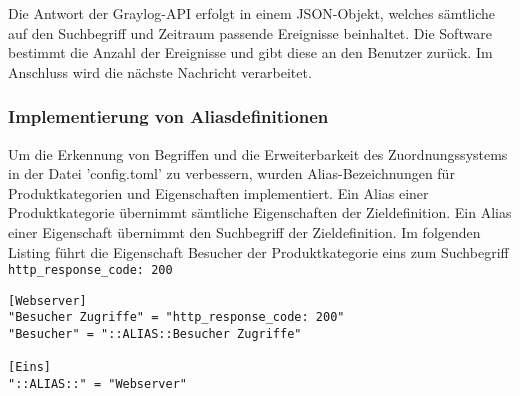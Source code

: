 Die Antwort der Graylog-API erfolgt in einem JSON-Objekt, welches sämtliche auf den Suchbegriff und Zeitraum passende Ereignisse beinhaltet. Die Software bestimmt die Anzahl der Ereignisse und gibt diese an den Benutzer zurück. Im Anschluss wird die nächste Nachricht verarbeitet.

\subsubsection{Implementierung von Aliasdefinitionen}

Um die Erkennung von Begriffen und die Erweiterbarkeit des Zuordnungssystems in der Datei 'config.toml' zu verbessern, wurden Alias-Bezeichnungen für Produktkategorien und Eigenschaften implementiert. Ein Alias einer Produktkategorie übernimmt sämtliche Eigenschaften der Zieldefinition. Ein Alias einer Eigenschaft übernimmt den Suchbegriff der Zieldefinition. Im folgenden Listing führt die Eigenschaft Besucher der Produktkategorie eins zum Suchbegriff \lstinline{http_response_code: 200}

\begin{lstlisting}[caption={Aliasdefinitionen in der Datei config.toml}, label=alias-config-toml, xleftmargin=6mm]
[Webserver]
"Besucher Zugriffe" = "http_response_code: 200"
"Besucher" = "::ALIAS::Besucher Zugriffe"

[Eins]
"::ALIAS::" = "Webserver"
\end{lstlisting}

